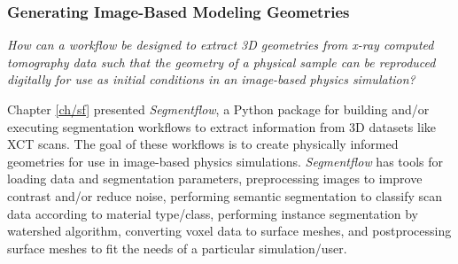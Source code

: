 \subsubsection{Generating Image-Based Modeling Geometries}
\noindent \textit{
    How can a workflow be designed to extract 3D geometries from x-ray
    computed tomography data such that the geometry of a physical sample can be
    reproduced digitally for use as initial conditions in an image-based physics
    simulation?
}

Chapter \ref{ch/sf} presented \textit{Segmentflow}, a Python package
for building and/or executing segmentation workflows to extract
information from 3D datasets like XCT scans. The goal of these workflows
is to create physically informed geometries for use in image-based physics
simulations. \textit{Segmentflow} has tools for loading data and segmentation
parameters, preprocessing images to improve contrast and/or reduce noise,
performing semantic segmentation to classify scan data according to material
type/class, performing instance segmentation by watershed algorithm,
converting voxel data to surface meshes, and postprocessing surface meshes
to fit the needs of a particular simulation/user.

